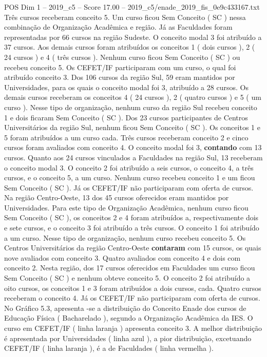 \begin{textsample}{POS Dim 1 – 2019\_c5 – Score 17.00 – 2019\_c5/enade\_2019\_fis\_0e9c433167.txt}
Três cursos receberam conceito 5.
Um curso ficou Sem Conceito ( SC ) nessa combinação de Organização Acadêmica e região.
Já as Faculdades foram representadas por 66 cursos na região Sudeste.
O conceito modal 3 foi atribuído a 37 cursos.
Aos demais cursos foram atribuídos os conceitos 1 ( dois cursos ), 2 ( 24 cursos ) e 4 ( três cursos ).
Nenhum curso ficou Sem Conceito ( SC ) ou recebeu conceito 5.
Os CEFET/IF participaram com um curso, o qual foi atribuído conceito 3.
Dos 106 cursos da região Sul, 59 eram mantidos por Universidades, para os quais o conceito modal foi 3, atribuído a 28 cursos.
Os demais cursos receberam os conceitos 4 ( 24 cursos ), 2 ( quatro cursos ) e 5 ( um curso ).
Nesse tipo de organização, nenhum curso da região Sul recebeu conceito 1 e dois ficaram Sem Conceito ( SC ).
Dos 23 cursos participantes de Centros Universitários da região Sul, nenhum ficou Sem Conceito ( SC ).
Os conceitos 1 e 5 foram atribuídos a um curso cada.
Três cursos receberam conceito 2 e cinco cursos foram avaliados com conceito 4.
O conceito modal foi 3, \textbf{contando} com 13 cursos.
Quanto aos 24 cursos vinculados a Faculdades na região Sul, 13 receberam o conceito modal 3.
O conceito 2 foi atribuído a seis cursos, o conceito 4, a três cursos, e o conceito 5, a um curso.
Nenhum curso recebeu conceito 1 e um ficou Sem Conceito ( SC ).
Já os CEFET/IF não participaram com oferta de cursos.
Na região Centro-Oeste, 13 dos 45 cursos oferecidos eram mantidos por Universidades.
Para este tipo de Organização Acadêmica, nenhum curso ficou Sem Conceito ( SC ), os conceitos 2 e 4 foram atribuídos a, respectivamente dois e sete cursos, e o conceito 3 foi atribuído a três cursos.
O conceito 1 foi atribuído a um curso.
Nesse tipo de organização, nenhum curso recebeu conceito 5.
Os Centros Universitários da região Centro-Oeste \textbf{contaram} com 15 cursos, os quais nove avaliados com conceito 3.
Quatro avaliados com conceito 4 e dois com conceito 2.
Nesta região, dos 17 cursos oferecidos em Faculdades um curso ficou Sem Conceito ( SC ) e nenhum obteve conceito 5.
O conceito 2 foi atribuído a oito cursos, os conceitos 1 e 3 foram atribuídos a dois cursos, cada.
Quatro cursos receberam o conceito 4.
Já os CEFET/IF não participaram com oferta de cursos.
No Gráfico 5.3, apresenta -se a distribuição do Conceito Enade dos cursos de Educação Física ( Bacharelado ), segundo a Organização Acadêmica da IES.
O curso em CEFET/IF ( linha laranja ) apresenta conceito 3.
A melhor distribuição é apresentada por Universidades ( linha azul ), a pior distribuição, excetuando CEFET/IF ( linha laranja ), é a de Faculdades ( linha vermelha ).

\end{textsample}
